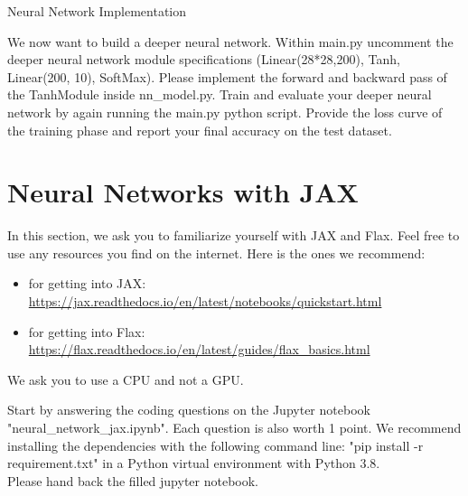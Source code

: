 \documentclass[
	ngerman,
	points=true,%
    solution=true,
    accentcolor=9c,
    colorbacktitle
	]{tudaexercise}
\begin{document}
\begin{task}{Neural Network Implementation}
\begin{subtask}
We now want to build a deeper neural network. Within main.py uncomment the deeper neural network module specifications (Linear(28*28,200), Tanh, Linear(200, 10), SoftMax). Please implement the forward and backward pass of the TanhModule inside nn\_model.py. Train and evaluate your deeper neural network by again running the main.py python script. Provide the loss curve of the training phase and report your final accuracy on the test dataset. 
\end{subtask}
\begin{solution}
\end{solution}

\end{task}

\newpage
\section*{Neural Networks with JAX}
In this section, we ask you to familiarize yourself with JAX and Flax. Feel free to use any resources you find on the internet. Here is the ones we recommend:
\begin{itemize}
    \item for getting into JAX: \url{https://jax.readthedocs.io/en/latest/notebooks/quickstart.html}
    \item for getting into Flax: \url{https://flax.readthedocs.io/en/latest/guides/flax_basics.html}
\end{itemize}
We ask you to use a CPU and not a GPU.
\begin{task}{Start by answering the coding questions on the Jupyter notebook "neural\_network\_jax.ipynb". Each question is also worth 1 point.}
We recommend installing the dependencies with the following command line: "pip install -r requirement.txt" in a Python virtual environment with Python 3.8.\\ 
Please hand back the filled jupyter notebook.
\end{task}
\end{document}
